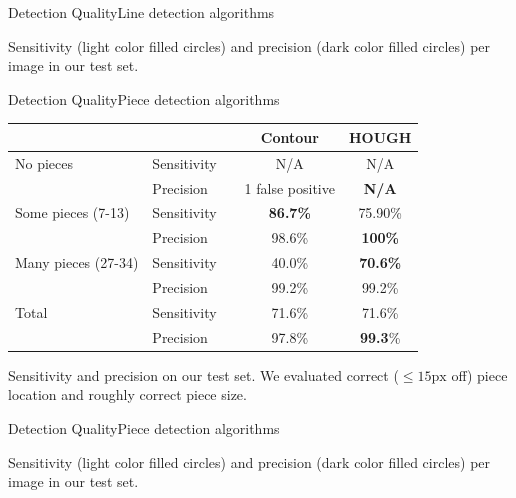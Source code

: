 \documentclass[table]{beamer}
\begin{document}
\begin{frame}{Detection Quality}{Line detection algorithms}
	\vspace{-15pt}
	
	\vspace{-15pt}
	Sensitivity (light color filled circles) and precision (dark color filled circles) per image in our test set.
\end{frame}

\begin{frame}{Detection Quality}{Piece detection algorithms}
	\vspace{-10pt}
	\begin{table}
		\centering
		\begin{tabular}{ll ccc}
		    \multicolumn{2}{c}{}											&\hphantom{A} & Contour 	& HOUGH	\\
			\toprule
			No pieces 								   		& Sensitivity 	&& N/A 				& N/A  			\\
															& Precision		&& 1 false positive & \bf{N/A} 		\\
			\midrule
			Some pieces (7-13)								& Sensitivity 	&& \bf{86.7\%} 	& 75.90\%			\\
															& Precision 	&& 98.6\% 		& \bf{100\%}		\\
			\midrule
			Many pieces (27-34) 							& Sensitivity 	&& 40.0\% 		& \bf{70.6\%} 		\\
															& Precision		&& 99.2\% 		& 99.2\%			\\
			\specialrule{\heavyrulewidth}{\aboverulesep}{7pt}

			Total				 							& Sensitivity 	&& 71.6\% 		& 71.6\% 			\\
															& Precision		&& 97.8\% 		& \textbf{99.3}\% 	\\
			\bottomrule
		\end{tabular}
	\end{table}
	Sensitivity and precision on our test set. We evaluated correct ($\leq 15\text{px}$ off) piece location and roughly correct piece size.
\end{frame}

\begin{frame}{Detection Quality}{Piece detection algorithms}
	\vspace{-15pt}
	
	\vspace{-15pt}
	Sensitivity (light color filled circles) and precision (dark color filled circles) per image in our test set.
\end{frame}
\end{document}
